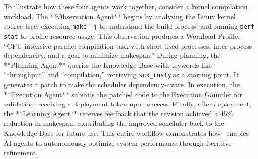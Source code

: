 To illustrate how these four agents work together, consider a kernel compilation workload. The **Observation Agent** begins by analyzing the Linux kernel source tree, executing \texttt{make -j} to understand the build process, and running \texttt{perf stat} to profile resource usage. This observation produces a Workload Profile: ``CPU-intensive parallel compilation task with short-lived processes, inter-process dependencies, and a goal to minimize makespan.'' During planning, the **Planning Agent** queries the Knowledge Base with keywords like ``throughput'' and ``compilation,'' retrieving \texttt{scx\_rusty} as a starting point. It generates a patch to make the scheduler dependency-aware. In execution, the **Execution Agent** submits the patched code to the Execution Gauntlet for validation, receiving a deployment token upon success. Finally, after deployment, the **Learning Agent** receives feedback that the revision achieved a 45\% reduction in makespan, contributing the improved scheduler back to the Knowledge Base for future use. This entire workflow demonstrates how \agent\ enables AI agents to autonomously optimize system performance through iterative refinement.


